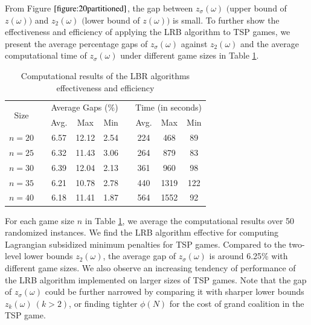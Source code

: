 \documentclass[authoryear,review,12pt]{elsarticle}
\begin{document}
From Figure $\ref{figure:20partitioned}$, the gap between $z_{\sigma}(\omega)$ $\big($upper bound of $z(\omega)$$\big)$ and $z_2(\omega)$ $\big($lower bound of $z(\omega)$$\big)$ is small.
To further show the effectiveness and efficiency of applying the LRB algorithm to TSP games, we present the average percentage gaps of $z_{\sigma}(\omega)$ against $z_2(\omega)$ and the average computational time of $z_{\sigma}(\omega)$ under different game sizes in Table \ref{table:detailed20}.


\begin{table}[H]
\centering
\tabcolsep=17pt
\renewcommand\arraystretch{1.0}
\caption{\label{table:detailed20}Computational results of the LBR algorithms effectiveness and efficiency}
\begin{tabular}[!h]{c c c c c c c c c}
\hline
\multirow{2}{*}{Size}  &\multicolumn{1}{c}{} &\multicolumn{3}{c}{Average Gaps (\%)}	&\multicolumn{1}{c}{} & \multicolumn{3}{c}{Time (in seconds)}\\
\cline{3-5}
\cline{7-9}
&	&Avg.	&Max	&Min	&	&Avg.	&Max	&Min\\
\hline
$n=20$	&	&6.57	&12.12	&2.54	&	&224	&468	&89\\

$n=25$	&	&6.32	&11.43	&3.06	&	&264	&879	&83\\

$n=30$	&	&6.39	&12.04	&2.13	&	&361	&960	&98\\

$n=35$	&	&6.21	&10.78	&2.78	&	&440	&1319	&122\\

$n=40$	&	&6.18	&11.41	&1.87	&	&564	&1552	&92\\
\hline
\end{tabular}
\end{table}
For each game size $n$ in Table \ref{table:detailed20}, we average the computational results over 50 randomized instances.
We find the LRB algorithm effective for computing Lagrangian subsidized minimum penalties for TSP games.
Compared to the two-level lower bounds $z_2(\omega)$, the average gap of $z_{\sigma}(\omega)$ is around 6.25\% with different game sizes.
We also observe an increasing tendency of performance of the LRB algorithm implemented on larger sizes of TSP games.
Note that the gap of $z_{\sigma}(\omega)$ could be further narrowed by comparing it with sharper lower bounds $z_k(\omega)~(k >2)$, or finding tighter $\phi(N)$ for the cost of grand coalition in the TSP game.
\end{document}
